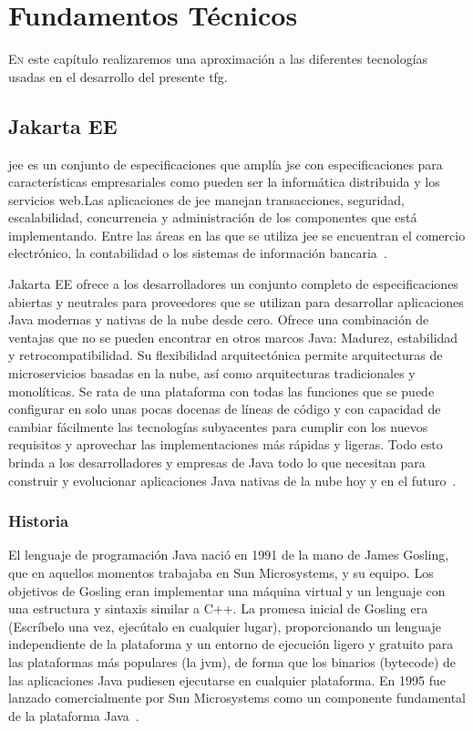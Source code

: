 \chapter{Fundamentos Técnicos}
\label{chap:fmtos-técnicos}


\lettrine{E}{n} este capítulo realizaremos una aproximación a las diferentes tecnologías usadas en el desarrollo del presente \acrshort{tfg}.


\section{Jakarta EE}
\label{sec:jakartaEE}


\acrlong{jee} es un conjunto de especificaciones que amplía \acrlong{jse} con especificaciones para características empresariales como pueden ser la informática distribuida y los servicios web.Las aplicaciones de \acrshort{jee} manejan transacciones, seguridad, escalabilidad, concurrencia y administración de los componentes que está implementando. Entre las áreas en las que se utiliza \acrshort{jee} se encuentran el comercio electrónico, la  contabilidad o los sistemas de información bancaria~\cite{WikiJakartaEE-engl}.

Jakarta EE ofrece a los desarrolladores un conjunto completo de especificaciones abiertas y neutrales para proveedores que se utilizan para desarrollar aplicaciones Java modernas y nativas de la nube desde cero. Ofrece una combinación de ventajas que no se pueden encontrar en otros marcos Java: Madurez, estabilidad y retrocompatibilidad. Su flexibilidad arquitectónica permite arquitecturas de microservicios basadas en la nube, así como arquitecturas tradicionales y monolíticas. Se rata de una plataforma con todas las funciones que se puede configurar en solo unas pocas docenas de líneas de código y con capacidad de cambiar fácilmente las tecnologías subyacentes para cumplir con los nuevos requisitos y aprovechar las implementaciones más rápidas y ligeras. Todo esto brinda a los desarrolladores y empresas de Java todo lo que necesitan para construir y evolucionar aplicaciones Java nativas de la nube hoy y en el futuro~\cite{JakartaEE-eclipse}.

\subsection{Historia}
\label{sec:historia}

El lenguaje de programación Java nació en 1991 de la mano de James Gosling, que en aquellos momentos trabajaba en Sun Microsystems, y su equipo. Los objetivos de Gosling eran implementar una máquina virtual y un lenguaje con una estructura y sintaxis similar a C++. La promesa inicial de Gosling era   (Escríbelo una vez, ejecútalo en cualquier lugar), proporcionando un lenguaje independiente de la plataforma y un entorno de ejecución ligero y gratuito para las plataformas más populares (la \acrfull{jvm}), de forma que los binarios (bytecode) de las aplicaciones Java pudiesen ejecutarse en cualquier plataforma. En 1995 fue lanzado comercialmente por Sun Microsystems como un componente fundamental de la plataforma Java~\cite{WikiJava-esp}. 

